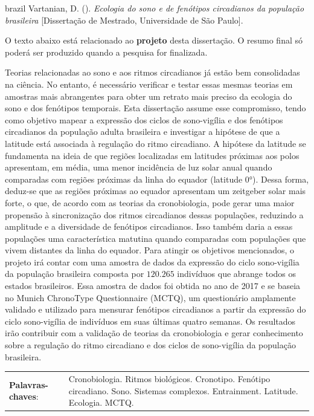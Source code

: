 \documentclass[
12pt,
openright,
oneside,
a4paper,
chapter=TITLE,
section=TITLE,
french,
spanish,
brazil,
english
]{abntex2}\usepackage{array}
\newcommand{\resumoestrangeironame}{Resumo}
\renewcommand{\resumoname}{Abstract}
\renewcommand{\resumoestrangeironame}{Resumo}
\renewcommand{\resumoname}{Resumo}
\renewcommand{\resumoestrangeironame}{Abstract}
\renewcommand{\resumoname}{Resumen}
\renewcommand{\resumoestrangeironame}{Resumo}
\renewcommand{\resumoname}{Résumé}
\renewcommand{\resumoestrangeironame}{Resumo}
\newenvironment{resumoenv}[1][\resumoname]{
  \pretextualchapter{#1}
  \begingroup
  \setlength{\parindent}{0cm}
  \setlength{\parskip}{\smallskipamount} %
  \AtBeginEnvironment{tabular}{\normalsize}
  \renewcommand{\arraystretch}{1}
  \setlength{\aboverulesep}{0ex}
  \setlength{\belowrulesep}{0ex}
  \setlength{\arrayrulewidth}{0pt}
  \setlength{\tabcolsep}{0cm}
  \vspace{-\smallskipamount} %
  \begin{SingleSpace}
}{
  \end{SingleSpace}
  \cleardoublepage
  \endgroup
}
\begin{document}

\begin{resumoenv}[\resumoestrangeironame]
\begin{otherlanguage*}{brazil}
Vartanian, D. ({\imprimirdata}). \textit{Ecologia do sono e de fenótipos circadianos da população brasileira} [Dissertação de Mestrado, Universidade de São Paulo].


O texto abaixo está relacionado ao \textbf{projeto} desta dissertação. O
resumo final só poderá ser produzido quando a pesquisa for finalizada.

Teorias relacionadas ao sono e aos ritmos circadianos já estão bem
consolidadas na ciência. No entanto, é necessário verificar e testar
essas mesmas teorias em amostras mais abrangentes para obter um retrato
mais preciso da ecologia do sono e dos fenótipos temporais. Esta
dissertação assume esse compromisso, tendo como objetivo mapear a
expressão dos ciclos de sono-vigília e dos fenótipos circadianos da
população adulta brasileira e investigar a hipótese de que a latitude
está associada à regulação do ritmo circadiano. A hipótese da latitude
se fundamenta na ideia de que regiões localizadas em latitudes próximas
aos polos apresentam, em média, uma menor incidência de luz solar anual
quando comparadas com regiões próximas da linha do equador (latitude
0°). Dessa forma, deduz-se que as regiões próximas ao equador apresentam
um zeitgeber solar mais forte, o que, de acordo com as teorias da
cronobiologia, pode gerar uma maior propensão à sincronização dos ritmos
circadianos dessas populações, reduzindo a amplitude e a diversidade de
fenótipos circadianos. Isso também daria a essas populações uma
característica matutina quando comparadas com populações que vivem
distantes da linha do equador. Para atingir os objetivos mencionados, o
projeto irá contar com uma amostra de dados da expressão do ciclo
sono-vigília da população brasileira composta por \(120.265\) indivíduos
que abrange todos os estados brasileiros. Essa amostra de dados foi
obtida no ano de 2017 e se baseia no Munich ChronoType Questionnaire
(MCTQ), um questionário amplamente validado e utilizado para mensurar
fenótipos circadianos a partir da expressão do ciclo sono-vigília de
indivíduos em suas últimas quatro semanas. Os resultados irão contribuir
com a validação de teorias da cronobiologia e gerar conhecimento sobre a
regulação do ritmo circadiano e dos ciclos de sono-vigília da população
brasileira.


\begin{tabular}{p{3.6cm} p{12.3cm}}
  \textbf{Palavras-chaves}: &  Cronobiologia. Ritmos biológicos. Cronotipo. Fenótipo circadiano. Sono. Sistemas complexos. Entrainment. Latitude. Ecologia. MCTQ.
\end{tabular}
\end{otherlanguage*}
\end{resumoenv}
\end{document}
